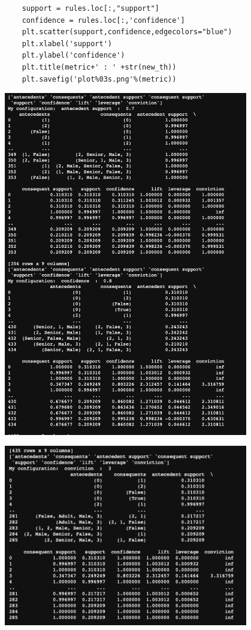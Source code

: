\documentclass{article}
\begin{document}
{\begin{lstlisting}
    support = rules.loc[:,"support"]
    confidence = rules.loc[:,'confidence']
    plt.scatter(support,confidence,edgecolors="blue")
    plt.xlabel('support')
    plt.ylabel('confidence')
    plt.title(metric+' : ' +str(new_th))
    plt.savefig('plot%03s.png'%(metric))
\end{lstlisting}
    \begin{center}
    \includegraphics[width=0.8\textwidth]{image15.png}\newline
\end{center}
    \begin{center}
    \includegraphics[width=0.8\textwidth]{image16.png}\newline

\end{center}}
\end{document}
